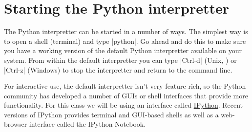 
\section{Starting the Python interpretter}

The Python interpretter can be started in a number of ways. The simplest
way is to open a shell (terminal) and type |python|. Go ahead and do
this to make sure you have a working version of the default Python
interpretter available on your system. From within the default
interpretter you can type |Ctrl-d| (Unix, \OSX) or
|Ctrl-z| (Windows) to stop the interpretter and return to the
command line.

For interactive use, the default interpretter isn't very feature rich,
so the Python community has developed a number of GUIs or shell
interfaces that provide more functionality. For this class we will be
using an interface called \href{http://ipython.org/}{IPython}. Recent versions of IPython provides terminal and GUI-based shells as well as a web-browser interface called the IPython Notebook. 



